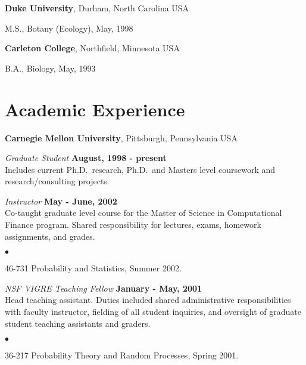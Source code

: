 \documentclass[margin,line]{res}
\newenvironment{list1}{
	\begin{list}{\ding{113}}{%
			\setlength{\itemsep}{0in}
			\setlength{\parsep}{0in} \setlength{\parskip}{0in}
			\setlength{\topsep}{0in} \setlength{\partopsep}{0in} 
			\setlength{\leftmargin}{0.17in}}}{\end{list}}
\newenvironment{list2}{
	\begin{list}{$\bullet$}{%
			\setlength{\itemsep}{0in}
			\setlength{\parsep}{0in} \setlength{\parskip}{0in}
			\setlength{\topsep}{0in} \setlength{\partopsep}{0in} 
			\setlength{\leftmargin}{0.2in}}}{\end{list}}
\begin{document}
\begin{resume}
		{\bf Duke University}, Durham, North Carolina USA\\
		\vspace*{-.1in}
		\begin{list1}
			\item[] M.S., Botany (Ecology),  May, 1998
		\end{list1}
		
		{\bf Carleton College}, Northfield, Minnesota USA\\
		\vspace*{-.1in}
		\begin{list1}
			\item[] B.A., Biology,  May, 1993
		\end{list1}
		
		
		
		\section{\sc Academic Experience}
		{\bf Carnegie Mellon University}, Pittsburgh, Pennsylvania USA
		
		\vspace{-.3cm}
		{\em Graduate Student} \hfill {\bf August, 1998 - present}\\
		Includes current Ph.D.~research, Ph.D.~and Masters level coursework and
		research/consulting projects.
		
		{\em Instructor} \hfill {\bf May - June, 2002}\\
		Co-taught graduate level course for the Master of Science in
		Computational Finance program.  Shared responsibility for lectures, exams,
		homework assignments, and  grades.  
		\vspace*{.05in}  
		\begin{list2}
			\item 46-731 Probability and Statistics, Summer 2002.
		\end{list2}
		
		
		{\em NSF VIGRE Teaching Fellow} \hfill {\bf January - May, 2001}\\
		Head teaching assistant.   
		Duties included  shared administrative responsibilities with faculty
		instructor, fielding of all student inquiries, and oversight of
		graduate student teaching assistants and graders.
		\vspace*{.05in}  
		\begin{list2}
			\item 36-217 Probability Theory and Random Processes, Spring 2001.
		\end{list2}
		

\end{resume}
\end{document}
